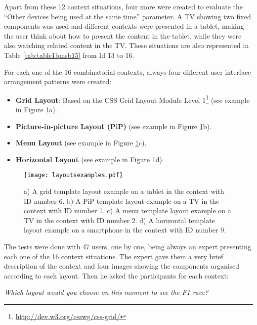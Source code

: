 Apart from these 12 context situations, four more were created to evaluate the “Other devices being used at the same time” parameter. A TV showing two fixed components was used and different contexts were presented in a tablet, making the user think about how to present the content in the tablet, while they were also watching related content in the TV. These situations are also represented in Table \ref{tab:table1bmsb15} from Id 13 to 16.

For each one of the 16 combinatorial contexts, always four different user interface arrangement patterns were created:
\begin{itemize}
	\item \textbf{Grid Layout}: Based on the CSS Grid Layout Module Level 1\footnote{\url{http://dev.w3.org/csswg/css-grid/}}  (see example in Figure \ref{fig:layexampBMSB15}a).
	\item \textbf{Picture-in-picture Layout (PiP)} (see example in Figure \ref{fig:layexampBMSB15}b).
	\item \textbf{Menu Layout} (see example in Figure \ref{fig:layexampBMSB15}c).
	\item \textbf{Horizontal Layout} (see example in Figure \ref{fig:layexampBMSB15}d).
\end{itemize}
\begin{figure}
	\centering
	\texttt{[image: layoutsexamples.pdf]}
	\caption[Layouts examples]{a) A grid template layout example on a tablet in the context with ID number 6. b) A PiP template layout example on a TV in the context with ID number 1. c) A menu template layout example on a TV in the context with ID number 2. d) A horizontal template layout example on a smartphone in the context with ID number 9.}
	\label{fig:layexampBMSB15}
\end{figure}

The tests were done with 47 users, one by one, being always an expert presenting each one of the 16 context situations. The expert gave them a very brief description of the context and four images showing the components organised according to each layout. Then he asked the participants for each context:

\begin{center}
\textit{Which layout would you choose on this moment to see the F1 race?}
\end{center}

